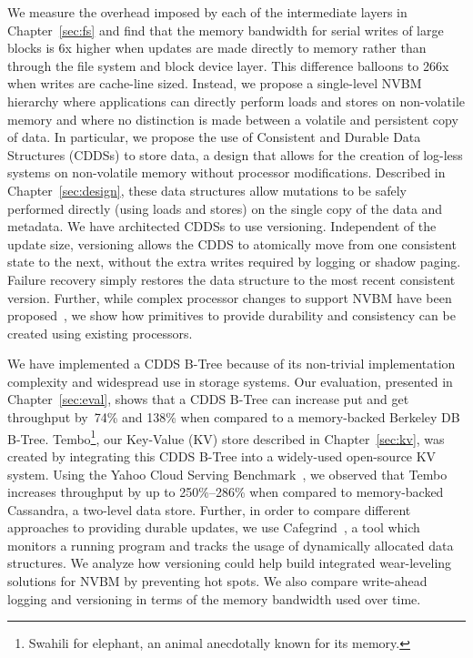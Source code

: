 We measure the overhead imposed by each of the intermediate layers in
Chapter~\ref{sec:fs} and find that the memory bandwidth for serial
writes of large blocks is 6x higher when updates are made directly to
memory rather than through the file system and block device layer.
This difference balloons to 266x when writes are cache-line sized.  
Instead, we propose a single-level NVBM hierarchy where applications 
can directly perform loads and stores on non-volatile memory and where
no distinction is made between a volatile and persistent copy of data.
In particular, we propose the use of Consistent and Durable Data
Structures (CDDSs) to store data, a design that allows for the
creation of log-less systems on non-volatile memory without processor
modifications.  Described in Chapter~\ref{sec:design}, these data
structures allow mutations to be safely performed directly (using
loads and stores) on the single copy of the data and metadata.  We
have architected CDDSs to use versioning.  Independent of the update
size, versioning allows the CDDS to atomically move from one
consistent state to the next, without the extra writes required by
logging or shadow paging.  Failure recovery simply restores the data
structure to the most recent consistent version.  Further, while
complex processor changes to support NVBM have been
proposed~\citep{Condit09}, we show how primitives to provide
durability and consistency can be created using existing processors.

We have implemented a CDDS B-Tree because of its non-trivial
implementation complexity and widespread use in storage systems.  Our
evaluation, presented in Chapter~\ref{sec:eval}, shows that a CDDS
B-Tree can increase put and get throughput by~74\% and 138\% when
compared to a memory-backed Berkeley DB B-Tree.
Tembo\footnote{Swahili for elephant, an animal anecdotally known for
  its memory.}, our Key-Value (KV) store described in
Chapter~\ref{sec:kv}, was created by integrating this CDDS B-Tree into
a widely-used open-source KV system. Using the Yahoo Cloud Serving
Benchmark~\citep{Cooper10}, we observed that Tembo increases
throughput by up to 250\%--286\% when compared to
memory-backed Cassandra, a two-level data store. Further, in order to 
compare different approaches to providing durable updates, we use 
Cafegrind~\citep{Chan11}, a tool which monitors a running program and 
tracks the usage of dynamically allocated data structures. We analyze
how versioning could help build integrated wear-leveling solutions for
NVBM by preventing hot spots. We also compare write-ahead logging and
versioning in terms of the memory bandwidth used over time.

